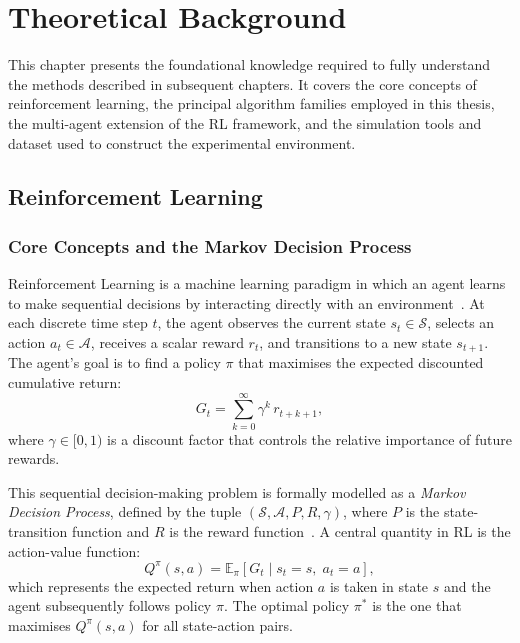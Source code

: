 \chapter{Theoretical Background}

This chapter presents the foundational knowledge required to fully understand the
methods described in subsequent chapters. It covers the core concepts of
reinforcement learning, the principal algorithm families employed in this thesis,
the multi-agent extension of the RL framework, and the simulation tools and dataset
used to construct the experimental environment.

\section{Reinforcement Learning}

\subsection{Core Concepts and the Markov Decision Process}

Reinforcement Learning is a machine learning paradigm in which an agent learns
to make sequential decisions by interacting directly with an
environment~\cite{sutton2018reinforcement}. At each discrete time step $t$, the
agent observes the current state $s_t \in \mathcal{S}$, selects an action
$a_t \in \mathcal{A}$, receives a scalar reward $r_t$, and transitions to a new
state $s_{t+1}$. The agent's goal is to find a policy $\pi$ that maximises the
expected discounted cumulative return:
\[
  G_t = \sum_{k=0}^{\infty} \gamma^k\, r_{t+k+1},
\]
where $\gamma \in [0,1)$ is a discount factor that controls the relative importance
of future rewards.

This sequential decision-making problem is formally modelled as a
\textit{Markov Decision Process}, defined by the tuple
$(\mathcal{S}, \mathcal{A}, P, R, \gamma)$, where $P$ is the state-transition
function and $R$ is the reward function~\cite{sutton2018reinforcement}. A central
quantity in RL is the action-value function:
\[
  Q^\pi(s,a) = \mathbb{E}_\pi\!\left[G_t \mid s_t = s,\; a_t = a\right],
\]
which represents the expected return when action $a$ is taken in state $s$ and the
agent subsequently follows policy $\pi$. The optimal policy $\pi^*$ is the one that
maximises $Q^\pi(s,a)$ for all state-action pairs.

